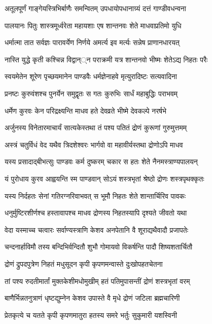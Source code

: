 \twolineshloka
{अतूलपूर्णं गाङ्गेयस्त्रिभिर्बाणैः समन्वितम्}
{उपधायोपधानाग्र्यं दत्तं गाण्डीवधन्वना}


\twolineshloka
{पालयानः पितुः शास्त्रमूर्ध्वरेता महायशाः}
{एष शान्तनवः शेते माधवाप्रतिमो युधि}


\twolineshloka
{धर्मात्मा तात सर्वज्ञः पारावर्येण निर्णये}
{अमर्त्य इव मर्त्यः सन्नेष प्राणानधारयत्}


\twolineshloka
{नास्ति युद्धे कृती कश्चिन्न विद्वान््न पराक्रमी}
{यत्र शान्तनवो भीष्मः शेतेऽद्य निहतः परैः}


\twolineshloka
{स्वयमेतेन शूरेण पृच्छयमानेन पाण्डवैः}
{धर्मज्ञेनाहवे मृत्युरादिष्टः सत्यवादिना}


\twolineshloka
{प्रनष्टः कुरुवंशश्च पुनर्येन समुद्वृतः}
{स गतः कुरुभिः सार्धं महाबुद्धिः पराभवम्}


\twolineshloka
{धर्मेण कुरवः केन परिद्रक्ष्यन्ति माधव}
{हते देवव्रते भीष्मे देवकल्पे नरर्षभे}


\twolineshloka
{अर्जुनस्य विनेतारमाचार्यं सात्यकेस्तथा}
{तं पश्य पतितं द्रोणं कुरूणां गुरुमुत्तमम्}


\twolineshloka
{अस्त्रं चतुर्विधं वेद यथैव त्रिदशेश्वरः}
{भार्गवो वा महावीर्यस्तथा द्रोणोऽपि माधव}


\twolineshloka
{यस्य प्रसादाद्बीभत्सुः पाण्डवः कर्म दुष्करम्}
{चकार स हतः शेते नैनमस्त्राण्यपालयन्}


\twolineshloka
{यं पुरोधाय कुरव आह्वयन्ति स्म पाण्डवान्}
{सोऽयं शस्त्रभृतां श्रेष्ठो द्रोणः शस्त्रपृथक्कृतः}


\twolineshloka
{यस्य निर्दहतः सेनां गतिरग्नरिवाभवत्}
{स भूमौ निहतः शेते शान्तार्चिरिव पावकः}


\twolineshloka
{धनुर्मुष्टिरशीर्णश्च हस्तावापश्च माधव}
{द्रोणस्य निहतस्यापि दृश्यते जीवतो यथा}


\twolineshloka
{वेदा यस्माच्च चत्वारः सर्वाण्यस्त्राणि केशव}
{अनपेतानि वै शूराद्यथैवादौ प्रजापतेः}


\twolineshloka
{चन्दनार्हाविमौ तस्य बन्दिभिर्वन्दितौ शुभौ}
{गोमायवो विकर्षन्ति पादौ शिष्यशतार्चितौ}


\twolineshloka
{द्रोणं द्रुपदपुत्रेण निहतं मधुसूदन}
{कृपी कृपणमन्वास्ते दुःखोपहतचेतना}


\twolineshloka
{तां पश्य रुदतीमार्तां मुक्तकेशीमधोमुखीम्}
{हतं पतिमुपासन्तीं द्रोणं शस्त्रभृतां वरम्}


\twolineshloka
{बाणैर्भिन्नतनुत्राणं धृष्टद्युम्नेन केशव}
{उपास्ते वै मृधे द्रोणं जटिला ब्रह्मचारिणी}


\twolineshloka
{प्रेतकृत्ये च यतते कृपी कृपणमातुरा}
{हतस्य समरे भर्तुः सुकुमारी यशस्विनी}


